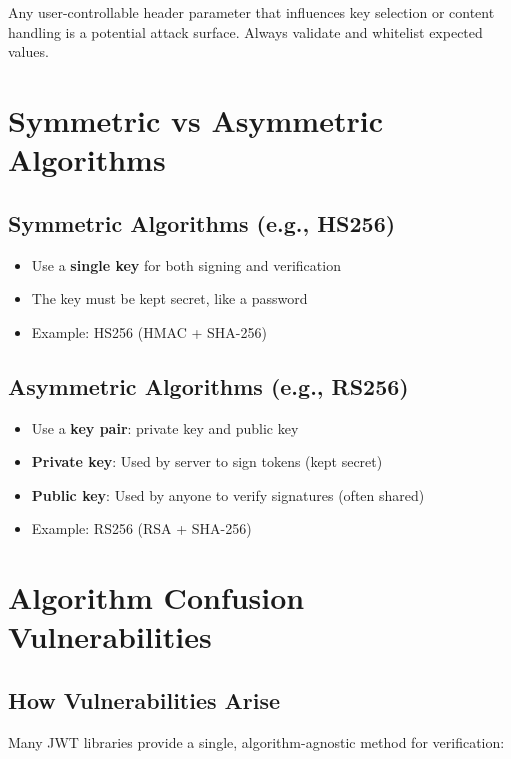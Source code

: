\documentclass{article}
\begin{document}
\begin{notebox}
Any user-controllable header parameter that influences key selection or content handling is a potential attack surface. Always validate and whitelist expected values.
\end{notebox}

\section{Symmetric vs Asymmetric Algorithms}

\subsection{Symmetric Algorithms (e.g., HS256)}

\begin{itemize}
    \item Use a \textbf{single key} for both signing and verification
    \item The key must be kept secret, like a password
    \item Example: HS256 (HMAC + SHA-256)
\end{itemize}

\subsection{Asymmetric Algorithms (e.g., RS256)}

\begin{itemize}
    \item Use a \textbf{key pair}: private key and public key
    \item \textbf{Private key}: Used by server to sign tokens (kept secret)
    \item \textbf{Public key}: Used by anyone to verify signatures (often shared)
    \item Example: RS256 (RSA + SHA-256)
\end{itemize}

\section{Algorithm Confusion Vulnerabilities}

\subsection{How Vulnerabilities Arise}

Many JWT libraries provide a single, algorithm-agnostic method for verification:
\end{document}
